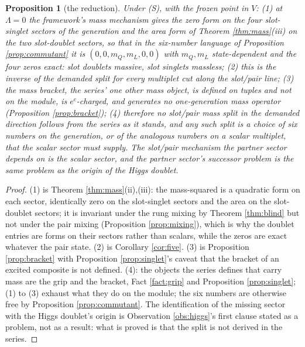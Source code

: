 \documentclass[11pt]{article}
\newtheorem{proposition}[theorem]{Proposition}
\theoremstyle{definition}
\begin{document}
\begin{proposition}[the reduction]\label{prop:reduction}
Under (S), with the frozen point in $V$: (1) at $\Lambda = 0$ the framework's mass mechanism gives the zero form on the four slot-singlet sectors of the generation and the area form of Theorem \ref{thm:mass}(iii) on the two slot-doublet sectors, so that in the six-number language of Proposition \ref{prop:commutant} it is $(0, 0, m_{Q}, m_{L}, 0, 0)$ with $m_{Q}, m_{L}$ state-dependent and the four zeros exact: slot doublets massive, slot singlets massless; (2) this is the inverse of the demanded split for every multiplet cut along the slot/pair line; (3) the mass bracket, the series' one other mass object, is defined on tuples and not on the module, is $e^{c}$-charged, and generates no one-generation mass operator (Proposition \ref{prop:bracket}); (4) therefore no slot/pair mass split in the demanded direction follows from the series as it stands, and any such split is a choice of six numbers on the generation, or of the analogous numbers on a scalar multiplet, that the scalar sector must supply. The slot/pair mechanism the partner sector depends on is the scalar sector, and the partner sector's successor problem is the same problem as the origin of the Higgs doublet.
\end{proposition}

\begin{proof}
(1) is Theorem \ref{thm:mass}(ii),(iii): the mass-squared is a quadratic form on each sector, identically zero on the slot-singlet sectors and the area on the slot-doublet sectors; it is invariant under the rung mixing by Theorem \ref{thm:blind} but not under the pair mixing (Proposition \ref{prop:mixing}), which is why the doublet entries are forms on their sectors rather than scalars, while the zeros are exact whatever the pair state. (2) is Corollary \ref{cor:five}. (3) is Proposition \ref{prop:bracket} with Proposition \ref{prop:singlet}'s caveat that the bracket of an excited composite is not defined. (4): the objects the series defines that carry mass are the grip and the bracket, Fact \ref{fact:grip} and Proposition \ref{prop:singlet}; (1) to (3) exhaust what they do on the module; the six numbers are otherwise free by Proposition \ref{prop:commutant}. The identification of the missing sector with the Higgs doublet's origin is Observation \ref{obs:higgs}'s first clause stated as a problem, not as a result: what is proved is that the split is not derived in the series.
\end{proof}
\end{document}
